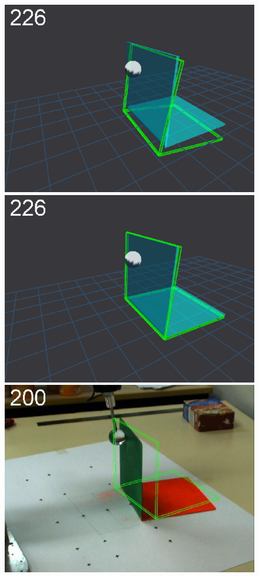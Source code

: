 \begin{figure}[tb]
{\includegraphics[width=\imgBXwid]{images/B1_2exp_20_3}
\includegraphics[width=\imgBXwid]{images/B1_3exp_20_3}
\includegraphics[width=\imgBXwid]{images/B2_2exp_58_3}
}
\end{figure}
